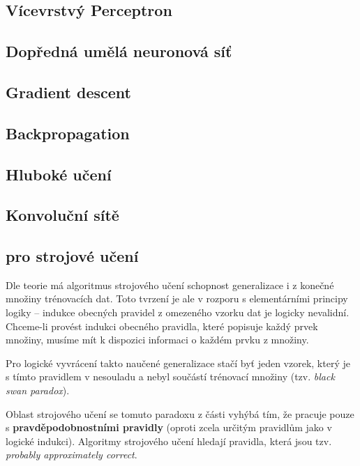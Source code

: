 \subsection{Vícevrstvý Perceptron}
\label{sec:multilayer_perceptron}

\subsection{Dopředná umělá neuronová síť}
\label{sec:feedforward_nn}
\subsection{Gradient descent}
\label{sec:gradient_descent}
\subsection{Backpropagation}
\subsection{Hluboké učení}
\label{sec:deep_learning}
\subsection{Konvoluční sítě}
\label{sec:cnn}

\subsection{ pro strojové učení}
\label{sec:no_free_lunch}
Dle teorie má algoritmus strojového učení schopnost generalizace i z konečné množiny trénovacích dat. 
Toto tvrzení je ale v rozporu s elementárními principy logiky – indukce obecných pravidel z omezeného vzorku dat je logicky nevalidní.
Chceme-li provést indukci obecného pravidla, které popisuje každý prvek množiny, musíme mít k dispozici informaci o každém prvku z množiny.  \cite{Goodfellow2016}

Pro logické vyvrácení takto naučené generalizace stačí byť jeden vzorek, který je s tímto pravidlem v nesouladu a nebyl součástí trénovací množiny (tzv. \emph{black swan paradox}).

Oblast strojového učení se tomuto paradoxu z části vyhýbá tím, že pracuje pouze s \textbf{pravděpodobnostními pravidly} (oproti zcela určitým pravidlům jako v logické indukci).
Algoritmy strojového učení hledají pravidla, která jsou tzv. \emph{probably approximately correct}. \cite{Valiant1984}

